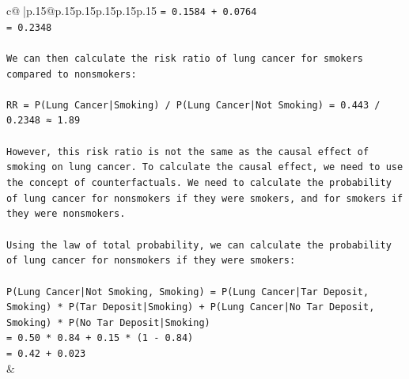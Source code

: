 \documentclass{article}
\begin{document}
{\begin{supertabular}{c@{$\;$}|p{.15\linewidth}@{}p{.15\linewidth}p{.15\linewidth}p{.15\linewidth}p{.15\linewidth}p{.15\linewidth}}
{{{\texttt{= 0.1584 + 0.0764} \\
\texttt{= 0.2348} \\
\\ 
\texttt{We can then calculate the risk ratio of lung cancer for smokers compared to nonsmokers:} \\
\\ 
\texttt{RR = P(Lung Cancer|Smoking) / P(Lung Cancer|Not Smoking) = 0.443 / 0.2348 ≈ 1.89} \\
\\ 
\texttt{However, this risk ratio is not the same as the causal effect of smoking on lung cancer. To calculate the causal effect, we need to use the concept of counterfactuals. We need to calculate the probability of lung cancer for nonsmokers if they were smokers, and for smokers if they were nonsmokers.} \\
\\ 
\texttt{Using the law of total probability, we can calculate the probability of lung cancer for nonsmokers if they were smokers:} \\
\\ 
\texttt{P(Lung Cancer|Not Smoking, Smoking) = P(Lung Cancer|Tar Deposit, Smoking) * P(Tar Deposit|Smoking) + P(Lung Cancer|No Tar Deposit, Smoking) * P(No Tar Deposit|Smoking)} \\
\texttt{= 0.50 * 0.84 + 0.15 * (1 {-} 0.84)} \\
\texttt{= 0.42 + 0.023} \\
            }
        }
    }
    & \\ \\


\end{supertabular}}
\end{document}
